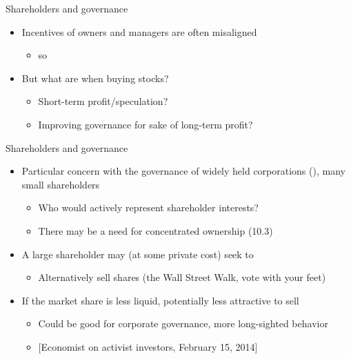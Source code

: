 \documentclass[english,10pt
,aspectratio=169
]{beamer}
\begin{document}
\begin{frame}{Shareholders and governance}
	\begin{itemize}
		\item Incentives of owners and managers are often misaligned
		\begin{itemize}
			\item so 
		\end{itemize}
		\item But what are  when buying stocks?
		\begin{itemize}
			\item Short-term profit/speculation?
			\item Improving governance for sake of long-term profit?
		\end{itemize}
	\end{itemize}
\end{frame}


\begin{frame}{Shareholders and governance}
	\begin{itemize}
		\item Particular concern with the governance of widely held corporations (\cite{berle_modern_1932}), many small shareholders
		\begin{itemize}
			\item Who would actively represent shareholder interests?
			\item There may be a need for concentrated ownership (10.3)
		\end{itemize}
		\item A large shareholder may (at some private cost) seek to 
		\begin{itemize}
			\item Alternatively sell shares (the Wall Street Walk, vote with your feet)
		\end{itemize}
		\item If the market share is less liquid, potentially less attractive to sell
		\begin{itemize}
			\item Could be good for corporate governance, more long-sighted behavior
			\item $[$Economist on activist investors, February 15, 2014]
		\end{itemize}
	\end{itemize}
\end{frame}
\end{document}

